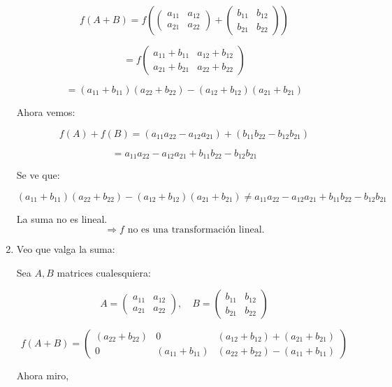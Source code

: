 \begin{enumerate}[label=(\alph*)]
  \[
  f(A + B) = f \left( \begin{pmatrix} a_{11} & a_{12} \\ a_{21} & a_{22} \end{pmatrix} +
  \begin{pmatrix} b_{11} & b_{12} \\ b_{21} & b_{22} \end{pmatrix} \right)
  \]
  
  \[
  = f \begin{pmatrix} a_{11} + b_{11} & a_{12} + b_{12} \\ a_{21} + b_{21} & a_{22} + b_{22} \end{pmatrix}
  \]
  
  \[
  = (a_{11} + b_{11})(a_{22} + b_{22}) - (a_{12} + b_{12})(a_{21} + b_{21})
  \]
  
  Ahora vemos:
  
  \[
  f(A) + f(B) = (a_{11} a_{22} - a_{12} a_{21}) + (b_{11} b_{22} - b_{12} b_{21})
  \]
  
  \[
  = a_{11} a_{22} - a_{12} a_{21} + b_{11} b_{22} - b_{12} b_{21}
  \]
  
  Se ve que:
  
  \[
  (a_{11} + b_{11})(a_{22} + b_{22}) - (a_{12} + b_{12})(a_{21} + b_{21}) \neq a_{11} a_{22} - a_{12} a_{21} + b_{11} b_{22} - b_{12} b_{21}
  \]
  
  La suma no es lineal.\[
  \Rightarrow f \text{ no es una transformación lineal.}
  \]
  
  \item Veo que valga la suma:

  Sea $A, B$ matrices cualesquiera:
  
  \[
  A = \begin{pmatrix} a_{11} & a_{12} \\ a_{21} & a_{22} \end{pmatrix}, \quad
  B = \begin{pmatrix} b_{11} & b_{12} \\ b_{21} & b_{22} \end{pmatrix}
  \]
  
  \[
  f(A + B) = 
  \begin{pmatrix} (a_{22} + b_{22}) & 0 & (a_{12} + b_{12}) + (a_{21} + b_{21}) \\ 0 & (a_{11} + b_{11}) & (a_{22} + b_{22}) - (a_{11} + b_{11}) \end{pmatrix}
  \]
  
  Ahora miro,
  

\end{enumerate}
